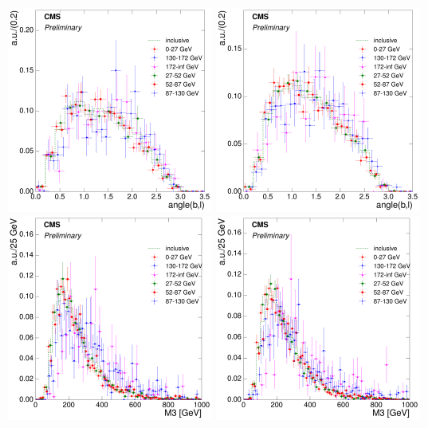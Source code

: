 \begin{figure}[hbtp]
     \includegraphics[width=0.48\textwidth]{Chapters/04_Analysis/04b_XSections/images/8TeV/fit_variables/electron/MET/angle_bl/vjets/MET_angle_bl_2orMoreBtags_VJets_template_comparison.pdf}\hfill
     \includegraphics[width=0.48\textwidth]{Chapters/04_Analysis/04b_XSections/images/8TeV/fit_variables/muon/MET/angle_bl/vjets/MET_angle_bl_2orMoreBtags_VJets_template_comparison.pdf}\\
     \includegraphics[width=0.48\textwidth]{Chapters/04_Analysis/04b_XSections/images/8TeV/fit_variables/electron/MET/M3/vjets/MET_M3_2orMoreBtags_VJets_template_comparison.pdf}\hfill
     \includegraphics[width=0.48\textwidth]{Chapters/04_Analysis/04b_XSections/images/8TeV/fit_variables/muon/MET/M3/vjets/MET_M3_2orMoreBtags_VJets_template_comparison.pdf}\\

\end{figure}

